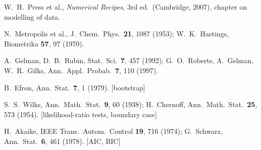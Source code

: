 \documentclass[11pt,a4paper]{article}
\numberwithin{equation}{section}
\theoremstyle{definition}
\theoremstyle{plain}
\theoremstyle{remark}
\numberwithin{algorithm}{section}
\begin{document}
\begin{small}
\begin{enumerate}[label={[\arabic*]},leftmargin=2.2em,itemsep=1pt]
\item W.~H.~Press et al., \emph{Numerical Recipes}, 3rd ed.\ (Cambridge, 2007), chapter on modelling of data.
\item N.~Metropolis et al., J.\ Chem.\ Phys.\ \textbf{21}, 1087 (1953); W.~K.~Hastings, Biometrika \textbf{57}, 97 (1970).
\item A.~Gelman, D.~B.~Rubin, Stat.\ Sci.\ \textbf{7}, 457 (1992); G.~O.~Roberts, A.~Gelman, W.~R.~Gilks, Ann.\ Appl.\ Probab.\ \textbf{7}, 110 (1997).
\item B.~Efron, Ann.\ Stat.\ \textbf{7}, 1 (1979). [bootstrap]
\item S.~S.~Wilks, Ann.\ Math.\ Stat.\ \textbf{9}, 60 (1938); H.~Chernoff, Ann.\ Math.\ Stat.\ \textbf{25}, 573 (1954). [likelihood-ratio tests, boundary case]
\item H.~Akaike, IEEE Trans.\ Autom.\ Control \textbf{19}, 716 (1974); G.~Schwarz, Ann.\ Stat.\ \textbf{6}, 461 (1978). [AIC, BIC]
\end{enumerate}
\end{small}
\end{document}
